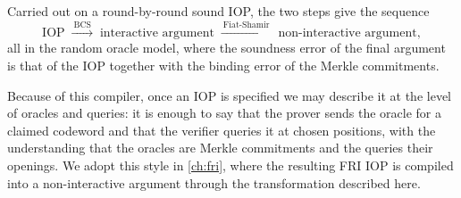 Carried out on a round-by-round sound IOP, the two steps give the
sequence
%
\[
\text{IOP}
\;\xrightarrow{\ \text{BCS}\ }\;
\text{interactive argument}
\;\xrightarrow{\ \text{Fiat-Shamir}\ }\;
\text{non-interactive argument} ,
\]
%
all in the random oracle model, where the soundness error of the final
argument is that of the IOP together with the binding error of the Merkle
commitments.
 
Because of this compiler, once an IOP is specified we may describe it at
the level of oracles and queries: it is enough to say that the prover
sends the oracle for a claimed codeword and that the verifier queries it
at chosen positions, with the understanding that the oracles are Merkle
commitments and the queries their openings. We adopt this style in
\cref{ch:fri}, where the resulting FRI IOP is compiled into a
non-interactive argument through the transformation described here.
 